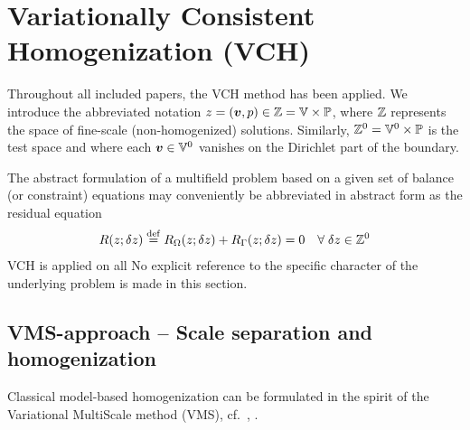 \documentclass[MikaelDissertation.tex]{subfiles}
\begin{document}

\section{Variationally Consistent Homogenization (VCH)}

Throughout all included papers, the VCH method has been applied.
We introduce the abbreviated notation $z = (\boldsymbol{v}, p) \in \mathbb{Z} = \mathbb{V} \times \mathbb{P}$, where $\mathbb{Z}$ represents the space of fine-scale (non-homogenized) solutions.
Similarly, $\mathbb{Z}^0 = \mathbb{V}^0 \times \mathbb{P}$ is the test space and where each $\boldsymbol{v}\in \mathbb{V}^0$ vanishes on the Dirichlet part of the boundary.

The abstract formulation of a multifield problem based on a given set of balance (or constraint) equations may conveniently be abbreviated in abstract form as the residual equation
\begin{align}
 R(z; \delta z) \overset{\mathrm{def}}{=} R_\Omega(z; \delta z) + R_\Gamma(z;\delta z) = 0\quad \forall\;\delta z\in \mathbb{Z}^0
\label{eq:A1}
\end{align}
VCH is applied on all 
No explicit reference to the specific character of the underlying problem is made in this section.

\subsection{VMS-approach -- Scale separation and homogenization}

Classical model-based homogenization can be formulated in the spirit of the Variational MultiScale method (VMS), cf.\ \cite{hughes_variational_1998}, \cite{larson_adaptive_2007}.

\end{document}
